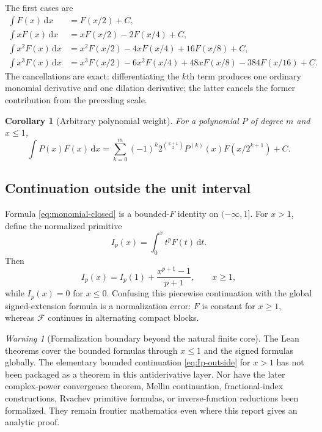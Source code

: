 \documentclass[11pt,oneside]{article}
\numberwithin{equation}{section}
\newtheorem{corollary}[theorem]{Corollary}
\theoremstyle{definition}
\theoremstyle{remark}
\newtheorem{warning}[theorem]{Warning}
\newcommand{\dd}{\,\mathrm d}
\begin{document}
The first cases are
\begin{align}
 \int F(x)\dd x
 &=F(x/2)+C,                                                \label{eq:p0}\\
 \int xF(x)\dd x
 &=xF(x/2)-2F(x/4)+C,                                      \label{eq:p1}\\
 \int x^2F(x)\dd x
 &=x^2F(x/2)-4xF(x/4)+16F(x/8)+C,                          \label{eq:p2}\\
 \int x^3F(x)\dd x
 &=x^3F(x/2)-6x^2F(x/4)+48xF(x/8)-384F(x/16)+C.            \label{eq:p3}
\end{align}
The cancellations are exact: differentiating the $k$th term produces one
ordinary monomial derivative and one dilation derivative; the latter cancels
the former contribution from the preceding scale.

\begin{corollary}[Arbitrary polynomial weight]
\label{cor:polynomial}
For a polynomial $P$ of degree $m$ and $x\le1$,
\begin{equation}
 \boxed{
 \int P(x)F(x)\dd x=
 \sum_{k=0}^{m}(-1)^k2^{\binom{k+1}{2}}
 P^{(k)}(x)F(x/2^{k+1})+C.}                                \label{eq:polynomial-closed}
\end{equation}
\end{corollary}

\subsection{Continuation outside the unit interval}
Formula \eqref{eq:monomial-closed} is a bounded-$F$ identity on
$(-\infty,1]$.
For $x>1$, define the normalized primitive
\begin{equation}
 I_p(x)=\int_0^xt^pF(t)\dd t.                              \label{eq:Ip-def-int}
\end{equation}
Then
\begin{equation}
 I_p(x)=I_p(1)+\frac{x^{p+1}-1}{p+1},\qquad x\ge1,         \label{eq:Ip-outside}
\end{equation}
while $I_p(x)=0$ for $x\le0$.  Confusing this piecewise continuation with the
global signed-extension formula is a normalization error: $F$ is constant for
$x\ge1$, whereas $\mathcal F$ continues in alternating compact blocks.

\begin{warning}[Formalization boundary beyond the natural finite core]
The Lean theorems cover the bounded formulas through $x\le1$ and the signed
formulas globally.  The elementary bounded continuation
\eqref{eq:Ip-outside} for $x>1$ has not been packaged as a theorem in this
antiderivative layer.  Nor have the later complex-power convergence theorem,
Mellin continuation, fractional-index constructions, Rvachev primitive
formulas, or inverse-function reductions been formalized.  They remain
frontier mathematics even where this report gives an analytic proof.
\end{warning}
\end{document}
